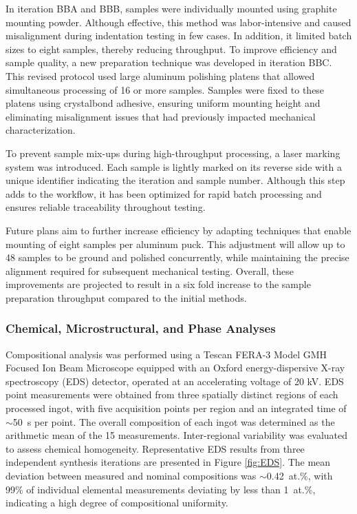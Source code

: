 In iteration BBA and BBB, samples were individually mounted using graphite mounting powder. Although effective, this method was labor-intensive and caused misalignment during indentation testing in few cases. In addition, it limited batch sizes to eight samples, thereby reducing throughput. To improve efficiency and sample quality, a new preparation technique was developed in iteration BBC. This revised protocol used large aluminum polishing platens that allowed simultaneous processing of 16 or more samples. Samples were fixed to these platens using crystalbond adhesive, ensuring uniform mounting height and eliminating misalignment issues that had previously impacted mechanical characterization. 

To prevent sample mix-ups during high-throughput processing, a laser marking system was introduced. Each sample is lightly marked on its reverse side with a unique identifier indicating the iteration and sample number. Although this step adds to the workflow, it has been optimized for rapid batch processing and ensures reliable traceability throughout testing.

Future plans aim to further increase efficiency by adapting techniques that enable mounting of eight samples per aluminum puck. This adjustment will allow up to 48 samples to be ground and polished concurrently, while maintaining the precise alignment required for subsequent mechanical testing. Overall, these improvements are projected to result in a six fold increase to the sample preparation throughput compared to the initial methods.


\subsubsection{Chemical, Microstructural, and Phase Analyses} 

Compositional analysis was performed using a Tescan FERA-3 Model GMH Focused Ion Beam Microscope equipped with an Oxford energy-dispersive X-ray spectroscopy (EDS) detector, operated at an accelerating voltage of 20 kV. EDS point measurements were obtained from three spatially distinct regions of each processed ingot, with five acquisition points per region and an integrated time of $\sim$50~s per point. The overall composition of each ingot was determined as the arithmetic mean of the 15 measurements. Inter-regional variability was evaluated to assess chemical homogeneity. Representative EDS results from three independent synthesis iterations are presented in Figure \autoref{fig:EDS}. The mean deviation between measured and nominal compositions was $\sim$0.42~at.\%, with 99\% of individual elemental measurements deviating by less than 1~at.\%, indicating a high degree of compositional uniformity.

